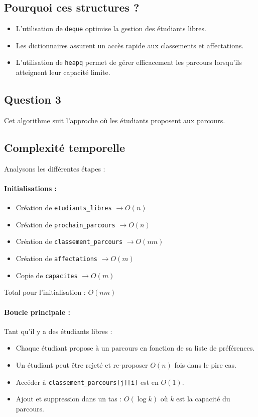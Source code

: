 \documentclass[a4paper,11pt]{article}
\begin{document}
\subsection{Pourquoi ces structures ?}
\begin{itemize}
    \item L’utilisation de \texttt{deque} optimise la gestion des étudiants libres.
    \item Les dictionnaires assurent un accès rapide aux classements et affectations.
    \item L’utilisation de \texttt{heapq} permet de gérer efficacement les parcours lorsqu'ils atteignent leur capacité limite.
\end{itemize}

\subsection*{Question 3}

Cet algorithme suit l'approche où les étudiants proposent aux parcours.

\subsection{Complexité temporelle}
Analysons les différentes étapes :

\paragraph{Initialisations :}
\begin{itemize}
    \item Création de \texttt{etudiants\_libres} $\rightarrow O(n)$
    \item Création de \texttt{prochain\_parcours} $\rightarrow O(n)$
    \item Création de \texttt{classement\_parcours} $\rightarrow O(nm)$
    \item Création de \texttt{affectations} $\rightarrow O(m)$
    \item Copie de \texttt{capacites} $\rightarrow O(m)$
\end{itemize}
Total pour l'initialisation : $O(nm)$

\paragraph{Boucle principale :} Tant qu'il y a des étudiants libres :
\begin{itemize}
    \item Chaque étudiant propose à un parcours en fonction de sa liste de préférences.
    \item Un étudiant peut être rejeté et re-proposer $O(n)$ fois dans le pire cas.
    \item Accéder à \texttt{classement\_parcours[j][i]} est en $O(1)$.
    \item Ajout et suppression dans un tas : $O(\log k)$ où $k$ est la capacité du parcours.
\end{itemize}
\end{document}
